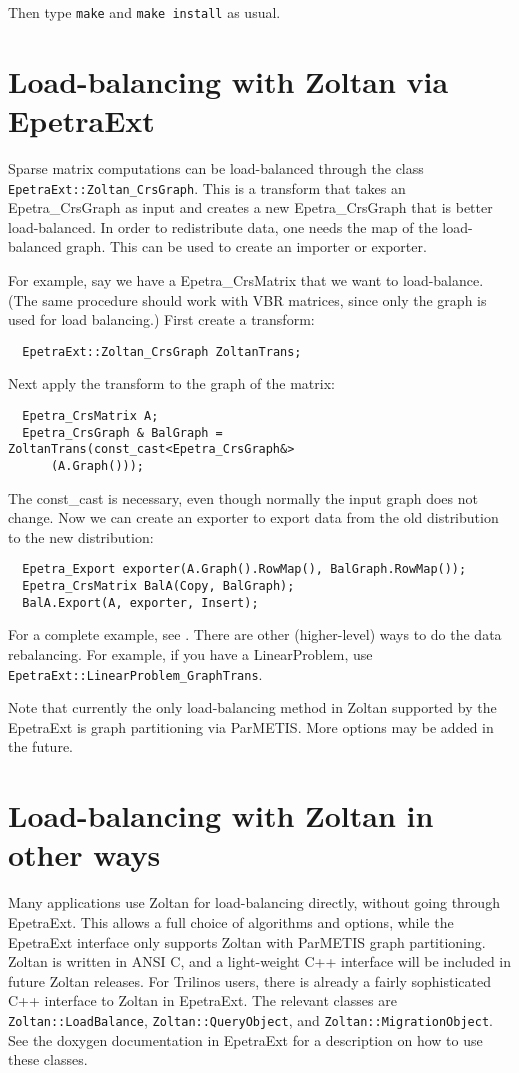 Then type \verb!make! and \verb!make install! as usual.

\section{Load-balancing with Zoltan via EpetraExt}
Sparse matrix computations can be load-balanced through
the class \\
\verb!EpetraExt::Zoltan_CrsGraph!. This is
a transform that takes an Epetra\_CrsGraph as input
and creates a new Epetra\_CrsGraph that is better load-balanced.
In order to redistribute data, one needs the map of the load-balanced
graph. This can be used to create an importer or exporter. 

For example, say we have a Epetra\_CrsMatrix that we want to load-balance.
(The same procedure should work with VBR matrices, since only the graph 
is used for load balancing.)
First create a transform:
\begin{verbatim}
  EpetraExt::Zoltan_CrsGraph ZoltanTrans;
\end{verbatim}
Next apply the transform to the graph of the matrix:
\begin{verbatim}
  Epetra_CrsMatrix A;
  Epetra_CrsGraph & BalGraph = ZoltanTrans(const_cast<Epetra_CrsGraph&>
      (A.Graph()));
\end{verbatim}
The const\_cast is necessary, even though normally the input graph does not 
change.
Now we can create an exporter to export data from the old distribution 
to the new distribution:
\begin{verbatim}
  Epetra_Export exporter(A.Graph().RowMap(), BalGraph.RowMap());
  Epetra_CrsMatrix BalA(Copy, BalGraph);
  BalA.Export(A, exporter, Insert);
\end{verbatim}

For a complete example, see .
There are other (higher-level) ways to do the data rebalancing. For example,
if you have a LinearProblem, use \verb!EpetraExt::LinearProblem_GraphTrans!.

Note that currently the only load-balancing method in Zoltan supported
by the EpetraExt is graph partitioning via ParMETIS. More
options may be added in the future.

\section{Load-balancing with Zoltan in other ways}

Many applications use Zoltan for load-balancing directly, without
going through EpetraExt. This allows a full choice of algorithms
and options, while the EpetraExt interface only supports
Zoltan with ParMETIS graph partitioning. Zoltan is written in ANSI C,
and a light-weight C++ interface will be included in future Zoltan
releases.  For Trilinos users, there is already a fairly sophisticated
C++ interface to Zoltan in EpetraExt. The relevant classes
are \verb!Zoltan::LoadBalance!, \verb!Zoltan::QueryObject!,
and \verb!Zoltan::MigrationObject!. See the doxygen documentation 
in EpetraExt for a description on how to use these classes.

